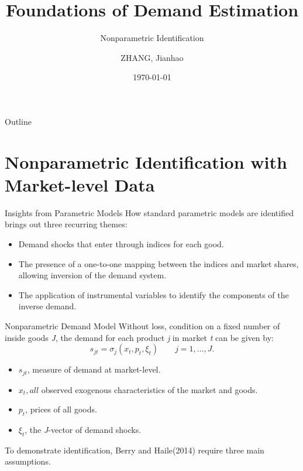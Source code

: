 \documentclass[aspectratio=169]{beamer}  %
\title{Foundations of Demand Estimation}
\subtitle{Nonparametric Identification}
\author{ZHANG, Jianhao}
\institute{Hong Kong University of Science and Technology}
\date{\today}
\begin{document}
\begin{frame}
    \titlepage
\end{frame}

\begin{frame}{Outline}
    \tableofcontents
\end{frame}


\section{Nonparametric Identification with Market-level Data}
\begin{frame}{Insights from Parametric Models}
How standard parametric models are identified brings out three recurring themes:
    \begin{itemize}
        \item Demand shocks that enter through indices for each good.
        \item The presence of a one-to-one mapping between the indices and market shares, allowing inversion of the demand system.
        \item The application of instrumental variables to identify the components of the inverse demand.
    \end{itemize}
\end{frame}

\begin{frame}{Nonparametric Demand Model}
    Without loss, condition on a fixed number of inside goods \textit{J}, the demand for each product \textit{j} in market \textit{t} can be given by:
    \begin{equation}
        s_{jt} = \sigma_j(x_t, p_t, \xi_t) \qquad j = 1, \ldots, J.
    \end{equation}
    \vspace{-0.5cm}
    \begin{itemize}
        \item \(s_{jt}\), measure of demand at market-level.
        \item \(x_t, all\) observed exogenous characteristics of the market and goods.
        \item \(p_t\), prices of all goods.
        \item \( \xi_{t}\), the \textit{J}-vector of demand shocks.
    \end{itemize}
    To demonstrate identification, Berry and Haile(2014) require three main assumptions.
\end{frame}
\end{document}

